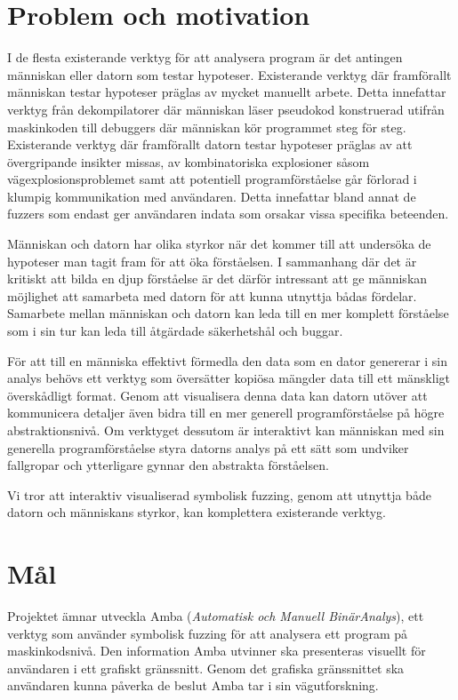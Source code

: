 \section{Problem och motivation}

I de flesta existerande verktyg för att analysera program är det antingen
människan eller datorn som testar hypoteser. Existerande verktyg där
framförallt människan testar hypoteser präglas av mycket manuellt arbete. Detta
innefattar verktyg från dekompilatorer där människan läser pseudokod konstruerad
utifrån maskinkoden till debuggers där människan kör programmet steg för steg.
Existerande verktyg där framförallt datorn testar hypoteser präglas av att
övergripande insikter missas, av kombinatoriska explosioner såsom
vägexplosionsproblemet samt att potentiell programförståelse går förlorad i
klumpig kommunikation med användaren. Detta innefattar bland annat de fuzzers
som endast ger användaren indata som orsakar vissa specifika beteenden.

Människan och datorn har olika styrkor när det kommer till att undersöka de
hypoteser man tagit fram för att öka förståelsen. I sammanhang där det är
kritiskt att bilda en djup förståelse är det därför intressant att ge människan
möjlighet att samarbeta med datorn för att kunna utnyttja bådas fördelar.
Samarbete mellan människan och datorn kan leda till en mer komplett förståelse
som i sin tur kan leda till åtgärdade säkerhetshål och buggar.

För att till en människa effektivt förmedla den data som en dator genererar i
sin analys behövs ett verktyg som översätter kopiösa mängder data till ett
mänskligt överskådligt format. Genom att visualisera denna data kan datorn
utöver att kommunicera detaljer även bidra till en mer generell
programförståelse på högre abstraktionsnivå. Om verktyget dessutom är
interaktivt kan människan med sin generella programförståelse styra datorns
analys på ett sätt som undviker fallgropar och ytterligare gynnar den abstrakta
förståelsen.

Vi tror att interaktiv visualiserad symbolisk fuzzing, genom att utnyttja både
datorn och människans styrkor, kan komplettera existerande verktyg.

\section{Mål}\label{sec:mal}

Projektet ämnar utveckla Amba (\emph{Automatisk och Manuell BinärAnalys}), ett
verktyg som använder symbolisk fuzzing för att analysera ett program på
maskinkodsnivå. Den information Amba utvinner ska presenteras visuellt för
användaren i ett grafiskt gränssnitt. Genom det grafiska gränssnittet ska
användaren kunna påverka de beslut Amba tar i sin vägutforskning.

